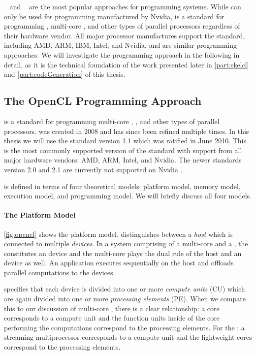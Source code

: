 \CUDA~\cite{CUDAProgrammingGuide} and \OpenCL~\cite{OpenCL} are the most popular approaches for programming \GPU systems.
While \CUDA can only be used for programming \GPUs manufactured by Nvidia, \OpenCL is a standard for programming \GPUs, multi-core \CPUs, and other types of parallel processors regardless of their hardware vendor.
All major processor manufactures support the \OpenCL standard, including AMD, ARM, IBM, Intel, and Nvidia.
\CUDA and \OpenCL are similar programming approaches.
We will investigate the \OpenCL programming approach in the following in detail, as it is the technical foundation of the work presented later in \autoref{part:skelcl} and \autoref{part:codeGeneration} of this thesis.


\subsection{The OpenCL Programming Approach}
\OpenCL is a standard for programming multi-core \CPUs, \GPUs, and other types of parallel processors.
\OpenCL was created in 2008 and has since been refined multiple times.
In this thesis we will use the \OpenCL standard version 1.1 which was ratified in June 2010.
This is the most commonly supported version of the standard with support from all major hardware vendors: AMD, ARM, Intel, and Nvidia.
The newer \OpenCL standards version 2.0 and 2.1 are currently not supported on Nvidia \GPUs.

\OpenCL is defined in terms of four theoretical models: platform model, memory model, execution model, and programming model.
We will briefly discuss all four models.

\paragraph{The \OpenCL Platform Model}
\autoref{fig:opencl} shows the \OpenCL platform model.
\OpenCL distinguishes between a \emph{host} which is connected to multiple \OpenCL \emph{devices}.
In a system comprising of a multi-core \CPU and a \GPU, the \GPU constitutes an \OpenCL device and the multi-core \CPU plays the dual rule of the host and an \OpenCL device as well.
An \OpenCL application executes sequentially on the host and offloads parallel computations to the \OpenCL devices.

\OpenCL specifies that each device is divided into one or more \emph{compute units} (CU) which are again divided into one or more \emph{processing elements} (PE).
When we compare this to our discussion of multi-core \CPUs, there is a clear relationship:
a \CPU core corresponds to a compute unit and the function units inside of the \CPU core performing the computations correspond to the processing elements.
For the \GPU: a streaming multiprocessor corresponds to a compute unit and the lightweight \GPU cores correspond to the processing elements.

